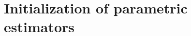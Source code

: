 \chapter{Initialization of parametric estimators}
\label{sec:initvals}
\gdef\thisDir{ch05-initvals}



